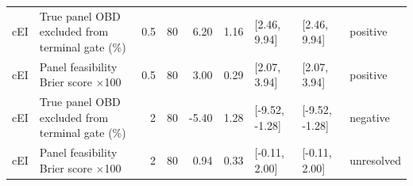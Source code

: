 \begin{longtable}{p{1.8cm}p{3.0cm}rrrrp{2.6cm}p{2.6cm}p{1.6cm}}
cEI & True panel OBD excluded from terminal gate (\%) & 0.5 & 80 & 6.20 & 1.16 & [2.46, 9.94] & [2.46, 9.94] & positive \\
cEI & Panel feasibility Brier score $\times$100 & 0.5 & 80 & 3.00 & 0.29 & [2.07, 3.94] & [2.07, 3.94] & positive \\
cEI & True panel OBD excluded from terminal gate (\%) & 2 & 80 & -5.40 & 1.28 & [-9.52, -1.28] & [-9.52, -1.28] & negative \\
cEI & Panel feasibility Brier score $\times$100 & 2 & 80 & 0.94 & 0.33 & [-0.11, 2.00] & [-0.11, 2.00] & unresolved \\
\bottomrule
\end{longtable}
